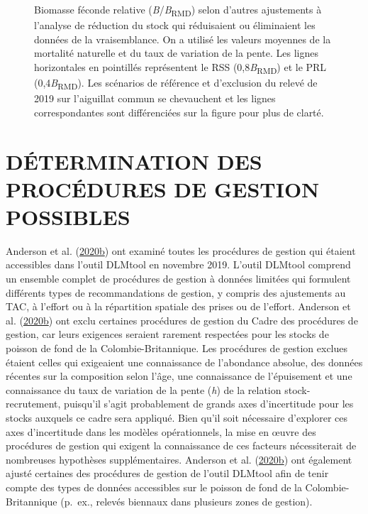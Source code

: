 \documentclass[11pt]{book}
\begin{document}
\begin{figure}[htb]

{\centering {} 

}

\caption{Biomasse féconde relative (\emph{B}/\emph{B}\textsubscript{RMD}) selon d'autres ajustements à l'analyse de réduction du stock qui réduisaient ou éliminaient les données de la vraisemblance. On a utilisé les valeurs moyennes de la mortalité naturelle et du taux de variation de la pente. Les lignes horizontales en pointillés représentent le RSS (0,8\emph{B}\textsubscript{RMD}) et le PRL (0,4\emph{B}\textsubscript{RMD}). Les scénarios de référence et d'exclusion du relevé de 2019 sur l'aiguillat commun se chevauchent et les lignes correspondantes sont différenciées sur la figure pour plus de clarté.}\label{fig:alt-SRA-fit}
\end{figure}
\clearpage

\hypertarget{sec:mp}{%
\section{DÉTERMINATION DES PROCÉDURES DE GESTION POSSIBLES}\label{sec:mp}}

Anderson et al. (\protect\hyperlink{ref-anderson2020gfmp}{2020}\protect\hyperlink{ref-anderson2020gfmp}{b}) ont examiné toutes les procédures de gestion qui étaient accessibles dans l'outil DLMtool en novembre 2019. L'outil DLMtool comprend un ensemble complet de procédures de gestion à données limitées qui formulent différents types de recommandations de gestion, y compris des ajustements au TAC, à l'effort ou à la répartition spatiale des prises ou de l'effort. Anderson et al. (\protect\hyperlink{ref-anderson2020gfmp}{2020}\protect\hyperlink{ref-anderson2020gfmp}{b}) ont exclu certaines procédures de gestion du Cadre des procédures de gestion, car leurs exigences seraient rarement respectées pour les stocks de poisson de fond de la Colombie-Britannique. Les procédures de gestion exclues étaient celles qui exigeaient une connaissance de l'abondance absolue, des données récentes sur la composition selon l'âge, une connaissance de l'épuisement et une connaissance du taux de variation de la pente (\emph{h}) de la relation stock-recrutement, puisqu'il s'agit probablement de grands axes d'incertitude pour les stocks auxquels ce cadre sera appliqué. Bien qu'il soit nécessaire d'explorer ces axes d'incertitude dans les modèles opérationnels, la mise en œuvre des procédures de gestion qui exigent la connaissance de ces facteurs nécessiterait de nombreuses hypothèses supplémentaires. Anderson et al. (\protect\hyperlink{ref-anderson2020gfmp}{2020}\protect\hyperlink{ref-anderson2020gfmp}{b}) ont également ajusté certaines des procédures de gestion de l'outil DLMtool afin de tenir compte des types de données accessibles sur le poisson de fond de la Colombie-Britannique (p.~ex., relevés biennaux dans plusieurs zones de gestion).
\end{document}
